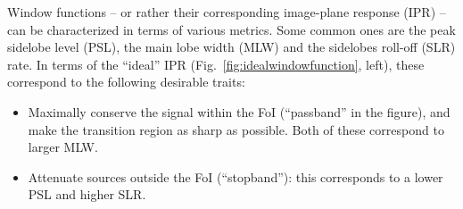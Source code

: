 \documentclass[useAMS,usenatbib]{mn2e}
\newcommand{\ATM}[1]{\textcolor{blue}{{\bf Marcellin: #1}}}
\newcommand{\GSF}[1]{\textcolor{red}{{\bf GSF: #1}}}
\begin{document}
% 

Window functions -- or rather their corresponding image-plane response (IPR) -- can be characterized in terms of various metrics. Some common 
ones are the peak sidelobe level (PSL), the main lobe width (MLW) and the sidelobes roll-off (SLR) rate. In terms of the ``ideal'' 
IPR (Fig.~\ref{fig:idealwindowfunction}, left), these correspond to the following desirable traits:

\begin{itemize}
\item Maximally conserve the signal within the FoI (``passband'' in the figure),
and make the transition region as sharp as possible. Both of these correspond to larger MLW.
\item Attenuate sources outside the FoI (``stopband''): this corresponds to a lower PSL and higher SLR.
\end{itemize}
\end{document}
